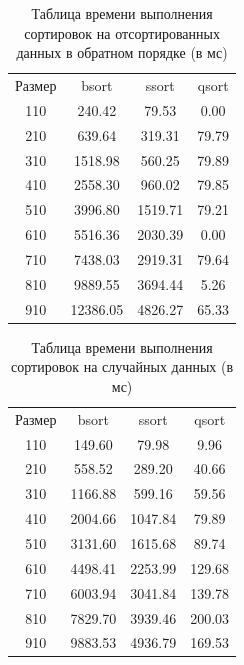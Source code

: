\documentclass{report}
\begin{document}
\begin{table} [h!]
	\caption{Таблица времени выполнения сортировок на отсортированных данных в обратном порядке (в мс)}
	\begin{center}
	\begin{tabular}{|c c c c|}

		\hline

		Размер & bsort & ssort & qsort \\ [0.5ex]
110 & 240.42 & 79.53 & 0.00  \\ 
\hline
210 & 639.64 & 319.31 & 79.79  \\ 
\hline
310 & 1518.98 & 560.25 & 79.89  \\ 
\hline
410 & 2558.30 & 960.02 & 79.85  \\ 
\hline
510 & 3996.80 & 1519.71 & 79.21  \\ 
\hline
610 & 5516.36 & 2030.39 & 0.00  \\ 
\hline
710 & 7438.03 & 2919.31 & 79.64  \\ 
\hline
810 & 9889.55 & 3694.44 & 5.26  \\ 
\hline
910 & 12386.05 & 4826.27 & 65.33  \\ 
\hline

	\end{tabular}
	\end{center}
\end{table}

\begin{table} [h!]
	\caption{Таблица времени выполнения сортировок на случайных данных (в мс)}
	\begin{center}
	\begin{tabular}{|c c c c|}

		\hline

		Размер & bsort & ssort  & qsort \\ [0.5ex]
110 & 149.60 & 79.98 & 9.96  \\ 
\hline
210 & 558.52 & 289.20 & 40.66  \\ 
\hline
310 & 1166.88 & 599.16 & 59.56  \\ 
\hline
410 & 2004.66 & 1047.84 & 79.89  \\ 
\hline
510 & 3131.60 & 1615.68 & 89.74  \\ 
\hline
610 & 4498.41 & 2253.99 & 129.68  \\ 
\hline
710 & 6003.94 & 3041.84 & 139.78  \\ 
\hline
810 & 7829.70 & 3939.46 & 200.03  \\ 
\hline
910 & 9883.53 & 4936.79 & 169.53  \\
\hline

	\end{tabular}
	\end{center}
\end{table}
\end{document}
